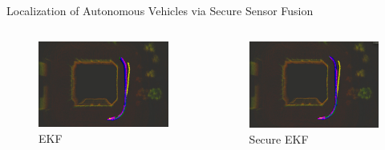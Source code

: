 \documentclass[10pt]{beamer}
\begin{document}
\begin{frame}{Localization of Autonomous Vehicles via Secure Sensor Fusion}
  \begin{columns}
    \begin{column}{0.48\textwidth}
      \begin{figure}
        \includegraphics[width=\textwidth]{gnssdrift.jpg}
        \caption{EKF}
      \end{figure}
    \end{column}
    \begin{column}{0.48\textwidth} 		
      \begin{figure}
        \includegraphics[width=\textwidth]{gnssdriftsafe.jpg}
        \caption{Secure EKF}
      \end{figure}
    \end{column}
  \end{columns}
\end{frame}
\end{document}
